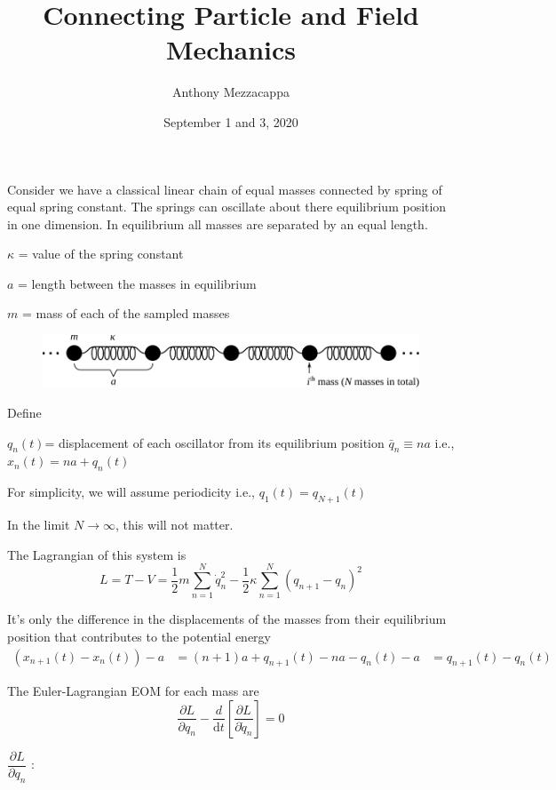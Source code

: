 \documentclass{article}
\title{Connecting Particle and Field Mechanics}
\author{Anthony Mezzacappa}
\date{September 1 and 3, 2020}
\begin{document}
\setlength{\parskip}{1em}

\maketitle

\noindent Consider we have a classical linear chain of equal masses connected by spring of equal spring constant. The springs can oscillate about there equilibrium position in one dimension. In equilibrium all masses are separated by an equal length. \par

$\kappa$ = value of the spring constant \par
$a$ = length between the masses in equilibrium\par
$m$ = mass of each of the sampled masses\par

\begin{figure}[h!]
    \centering
    \includegraphics[width=\textwidth]{pics/04-linear-chain.pdf}
    \label{fig:l4-linear-chain}
\end{figure}

\noindent Define \par
\noindent $q_n(t) $= displacement of each oscillator from its equilibrium position $\bar{q}_n \equiv na $ i.e., $x_n(t) = na+q_n(t)$ \par
\noindent For simplicity, we will assume periodicity i.e., $q_1(t) =q_{N+1}(t)$ \par
\noindent In the limit $N \rightarrow \infty$, this will not matter. \par


\noindent The Lagrangian of this system is
\begin{equation}
    L = T - V  = \frac{1}{2} m \sum_{n=1}^N \dot{q}_n^2 - \frac{1}{2} \kappa \sum_{n=1}^N (q_{n+1} - q_n)^2
\end{equation}

\noindent It's only the difference in the displacements of the masses from their equilibrium position that contributes to the potential energy
\begin{align*}
    \left( x_{n+1} (t) - x_n (t) \right) - a &= ( n + 1 ) a + q_{n+1} (t) - n a - q_n (t) - a 
    &= q_{n+1} (t) - q_n (t)
\end{align*}

\noindent The Euler-Lagrangian EOM for each mass are
\begin{equation}
    \dfrac{ \partial L }{ \partial q_n} -  \dfrac{d}{ \mathrm{d} t} \left[\dfrac{ \partial L }{ \partial \dot {q}_n } \right] = 0
\end{equation}

$\dfrac{ \partial L }{ \partial q_n}$ :
\end{document}
